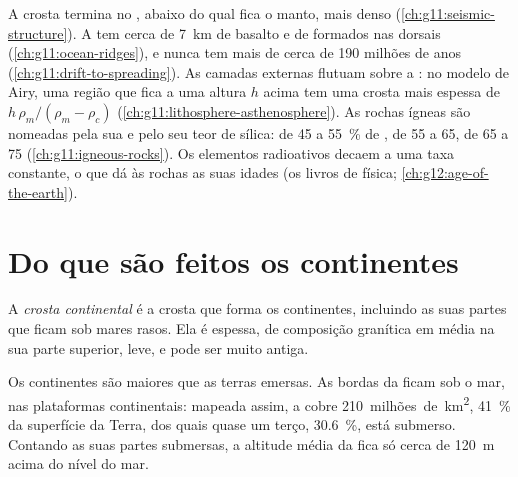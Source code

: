\begin{recall}
A crosta termina no , abaixo do qual fica o manto, mais denso
(\cref{ch:g11:seismic-structure}). A  tem cerca de
\qty{7}{km} de basalto e de  formados nas dorsais
(\cref{ch:g11:ocean-ridges}), e nunca tem mais de cerca de 190 milhões de
anos (\cref{ch:g11:drift-to-spreading}). As camadas externas flutuam sobre a
: no modelo de Airy, uma região que fica a uma altura $h$ acima
tem uma crosta mais espessa de $h\,\rho_m/(\rho_m -
\rho_c)$ (\cref{ch:g11:lithosphere-asthenosphere}). As rochas ígneas são
nomeadas pela sua  e pelo seu teor de sílica:  de 45 a
\qty{55}{\percent} de ,  de 55 a 65,  de 65 a
75 (\cref{ch:g11:igneous-rocks}). Os elementos radioativos decaem a uma taxa
constante, o que dá às rochas as suas idades (os livros de física;
\cref{ch:g12:age-of-the-earth}).
\end{recall}

\section{Do que são feitos os continentes}

\begin{definition}\label{def:g12:continental-crust:continental-crust}
A \emph{crosta continental} é a crosta que forma
os continentes, incluindo as suas partes que ficam sob mares rasos. Ela é
espessa, de composição granítica em média na sua parte superior, leve, e
pode ser muito antiga.
\end{definition}

Os continentes são maiores que as terras emersas. As bordas da  ficam sob o mar, nas plataformas continentais: mapeada assim, a
 cobre \num{210}~milhões~de~\unit{km^2}, \qty{41}{\percent}
da superfície da Terra, dos quais quase um terço, \qty{30.6}{\percent}, está
submerso. Contando as suas partes submersas, a altitude média da  fica só cerca de \qty{120}{m} acima do nível do mar.

